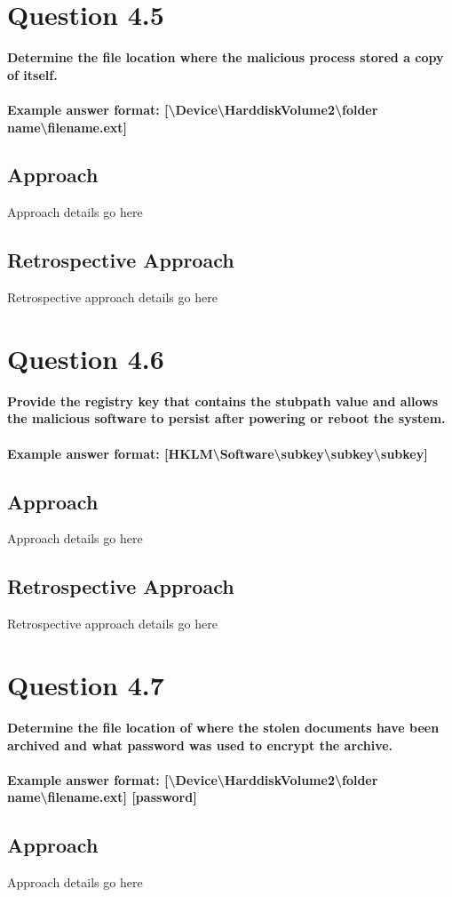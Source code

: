 \section{Question 4.5}
\textbf{Determine the file location where the malicious process stored a copy of
itself.
\\\\
Example answer format:
[\textbackslash{}Device\textbackslash{}HarddiskVolume2\textbackslash{}folder
name\textbackslash{}filename.ext]}
\subsection{Approach}
Approach details go here
\subsection{Retrospective Approach}
Retrospective approach details go here

\section{Question 4.6}
\textbf{Provide the registry key that contains the stubpath value and allows the
malicious software to persist after powering or reboot the system.
\\\\
Example answer format:
[HKLM\textbackslash{}Software\textbackslash{}subkey\textbackslash{}subkey\textbackslash{}subkey]}
\subsection{Approach}
Approach details go here
\subsection{Retrospective Approach}
Retrospective approach details go here

\section{Question 4.7}
\textbf{Determine the file location of where the stolen documents have been
archived and what password was used to encrypt the archive.
\\\\
Example answer format:
[\textbackslash{}Device\textbackslash{}HarddiskVolume2\textbackslash{}folder
name\textbackslash{}filename.ext] [password]}
\subsection{Approach}
Approach details go here
